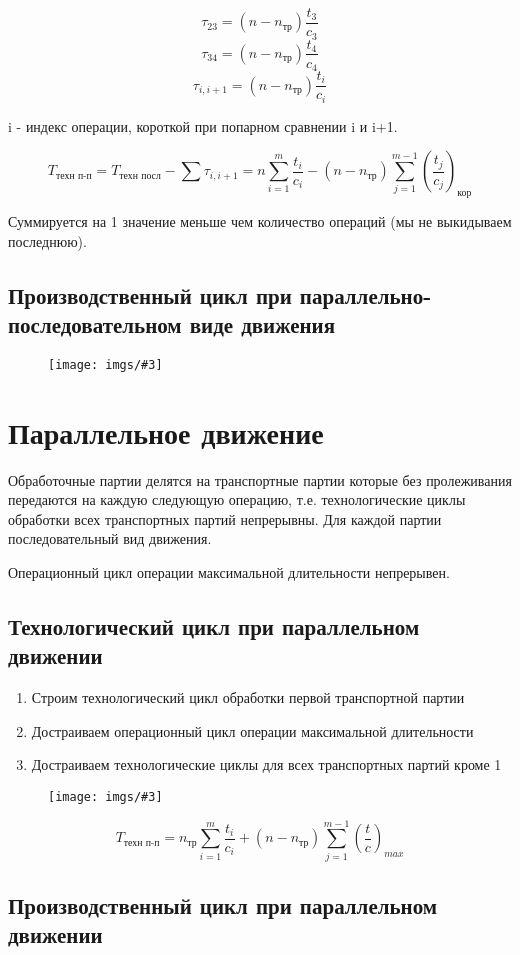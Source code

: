 \documentclass[14pt,a4paper,oneside]{extarticle}
\newcommand{\pic}[3]{
	\begin{figure}[#1]
		\begin{center}
			\texttt{[image: imgs/\#3]}
		\end{center}
	\end{figure}
}
\begin{document}
\[\tau_{23}=(n-n_\text{тр})\frac{t_3}{c_3}\]
\[\tau_{34}=(n-n_\text{тр})\frac{t_4}{c_4}\]
\[\tau_{i,i+1}=(n-n_\text{тр})\frac{t_i}{c_i}\]

i - индекс операции, короткой при попарном сравнении i и i+1.

\[T_\text{техн п-п}=T_\text{техн посл}-\sum\tau_{i,i+1}=n\sum_{i=1}^m\frac{t_i}{c_i}-(n-n_\text{тр})\sum_{j=1}^{m-1}\left(\frac{t_j}{c_j}\right)_\text{кор} \]

Суммируется на 1 значение меньше чем количество операций (мы не выкидываем последнюю). 

\subsection{Производственный цикл при параллельно-последовательном виде движения}

\pic{H}{\textwidth}{6}

\section{Параллельное движение}

Обработочные партии делятся на транспортные партии которые без пролеживания передаются на каждую следующую операцию, т.е. технологические циклы обработки всех транспортных партий непрерывны. Для каждой партии последовательный вид движения.

Операционный цикл операции максимальной длительности непрерывен.

\subsection{Технологический цикл при параллельном движении}

\begin{enumerate}
    \item Строим технологический цикл обработки первой транспортной партии
    \item Достраиваем операционный цикл операции максимальной длительности
    \item Достраиваем технологические циклы для всех транспортных партий кроме 1
\end{enumerate}

\pic{H}{\textwidth}{7}

\[T_\text{техн п-п}=n_\text{тр}\sum_{i=1}^m\frac{t_i}{c_i}+(n-n_\text{тр})\sum_{j=1}^{m-1}\left(\frac{t}{c}\right)_{max} \]

\subsection{Производственный цикл при параллельном движении}
\end{document}
